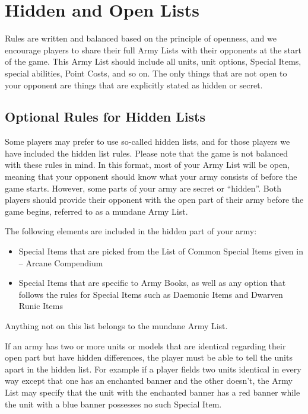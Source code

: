 \newpage
\section{Hidden and Open Lists}
\label{hidden_and_open_lists}

Rules are written and balanced based on the principle of openness, and we encourage players to share their full Army Lists with their opponents at the start of the game. This Army List should include all units, unit options, Special Items, special abilities, Point Costs, and so on. The only things that are not open to your opponent are things that are explicitly stated as hidden or secret.

\begin{optionalrules}
\subsection{Optional Rules for Hidden Lists}
\label{optional_rules_for_hidden_lists}

Some players may prefer to use so-called hidden lists, and for those players we have included the hidden list rules. Please note that the game is not balanced with these rules in mind. In this format, most of your Army List will be open, meaning that your opponent should know what your army consists of before the game starts. However, some parts of your army are secret or \enquote{hidden}. Both players should provide their opponent with the open part of their army before the game begins, referred to as a mundane Army List.

The following elements are included in the hidden part of your army:

\begin{itemize}
\item Special Items that are picked from the List of Common Special Items given in \nameofthegame{} -- Arcane Compendium
\item Special Items that are specific to Army Books, as well as any option that follows the rules for Special Items such as Daemonic Items and Dwarven Runic Items
\end{itemize}

Anything not on this list belongs to the mundane Army List.

If an army has two or more units or models that are identical regarding their open part but have hidden differences, the player must be able to tell the units apart in the hidden list. For example if a player fields two units identical in every way except that one has an enchanted banner and the other doesn't, the Army List may specify that the unit with the enchanted banner has a red banner while the unit with a blue banner possesses no such Special Item.


\end{optionalrules}
